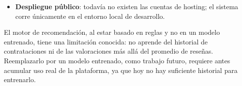 \begin{itemize}
    \item \textbf{Despliegue público}: todavía no existen las cuentas de
          hosting; el sistema corre únicamente en el entorno local de
          desarrollo.
\end{itemize}

El motor de recomendación, al estar basado en reglas y no en un modelo
entrenado, tiene una limitación conocida: no aprende del historial de
contrataciones ni de las valoraciones más allá del promedio de reseñas.
Reemplazarlo por un modelo entrenado, como trabajo futuro, requiere antes
acumular uso real de la plataforma, ya que hoy no hay suficiente
historial para entrenarlo.
